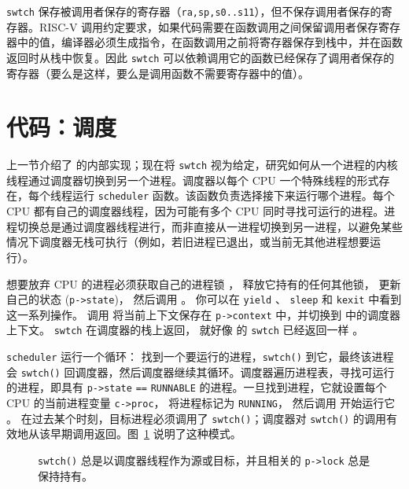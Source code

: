 \lstinline{swtch}
保存被调用者保存的寄存器（{\tt ra,sp,s0..s11}），但不保存调用者保存的寄存器。RISC-V 调用约定要求，如果代码需要在函数调用之间保留调用者保存寄存器中的值，编译器必须生成指令，在函数调用之前将寄存器保存到栈中，并在函数返回时从栈中恢复。因此 \lstinline{swtch} 可以依赖调用它的函数已经保存了调用者保存的寄存器（要么是这样，要么是调用函数不需要寄存器中的值）。

\section{代码：调度}


上一节介绍了
的内部实现；现在将
\lstinline{swtch}
视为给定，研究如何从一个进程的内核线程通过调度器切换到另一个进程。调度器以每个 CPU 一个特殊线程的形式存在，每个线程运行
\lstinline{scheduler}
函数。该函数负责选择接下来运行哪个进程。每个 CPU 都有自己的调度器线程，因为可能有多个 CPU 同时寻找可运行的进程。进程切换总是通过调度器线程进行，而非直接从一进程切换到另一进程，以避免某些情况下调度器无栈可执行（例如，若旧进程已退出，或当前无其他进程想要运行）。

想要放弃 CPU 的进程必须获取自己的进程锁
，
释放它持有的任何其他锁，
更新自己的状态
(\lstinline{p->state})，
然后调用
。
你可以在
\lstinline{yield}
、
\texttt{sleep}
和
\texttt{kexit}
中看到这一系列操作。
调用
将当前上下文保存在
\lstinline{p->context}
中，并切换到
中的调度器上下文。
\lstinline{swtch}
在调度器的栈上返回，
就好像
的
\lstinline{swtch}
已经返回一样
。

\lstinline{scheduler}
运行一个循环：
找到一个要运行的进程，{\tt swtch()} 到它，最终该进程会 {\tt swtch()} 回调度器，然后调度器继续其循环。调度器遍历进程表，寻找可运行的进程，即具有
\lstinline{p->state}
\lstinline{==}
\lstinline{RUNNABLE}
的进程。一旦找到进程，它就设置每个 CPU 的当前进程变量
\lstinline{c->proc}，
将进程标记为
\lstinline{RUNNING}，
然后调用
开始运行它
。
在过去某个时刻，目标进程必须调用了 {\tt swtch()}；调度器对 {\tt swtch()} 的调用有效地从该早期调用返回。图~\ref{fig:inout} 说明了这种模式。

\begin{figure}[t]

\caption{{\tt swtch()} 总是以调度器线程作为源或目标，并且相关的 {\tt p->lock} 总是保持持有。}
\label{fig:inout}
\end{figure}


